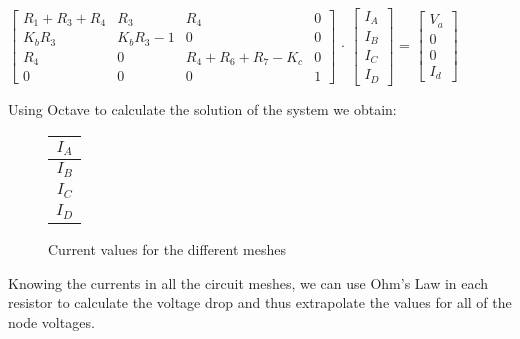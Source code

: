 $\begin{bmatrix}
    R_1 + R_3 + R_4 & R_3        & R_4             & 0 \\
    K_bR_3          & K_bR_3 - 1 & 0               & 0 \\
    R_4             & 0          & R_4+R_6+R_7-K_c & 0 \\
    0               & 0          & 0               & 1 
\end{bmatrix}$ $\cdot$
$\begin{bmatrix}
     I_A \\ I_B \\I_C \\I_D
\end{bmatrix}$ =
$\begin{bmatrix}
    V_a \\ 0 \\ 0 \\ I_d
\end{bmatrix}$

\vspace{20pt}
Using Octave to calculate the solution of the system we obtain:
\vspace{20pt}

\begin{figure}[h]
	\begin{center}
	    \begin{minipage}{.3\textwidth}
		\flushright
		\begin{tabular}{|c|}
		    \hline
		    $I_A$ \\
		    \hline
		    $I_B$ \\
		    \hline
		    $I_C$ \\
		    \hline
		    $I_D$ \\
		    \hline
		\end{tabular}
	    \end{minipage}
	    \hspace{-8pt}
	    \begin{minipage}{.3\textwidth}
		\flushleft
		
	    \end{minipage}
	\end{center}
	\caption{Current values for the different meshes}
	\label{theory_currents}
\end{figure}

 Knowing the currents in all the circuit meshes, we can use Ohm's Law in each resistor to calculate the voltage drop and thus extrapolate the values for all of the node voltages.
 \newpage
 
